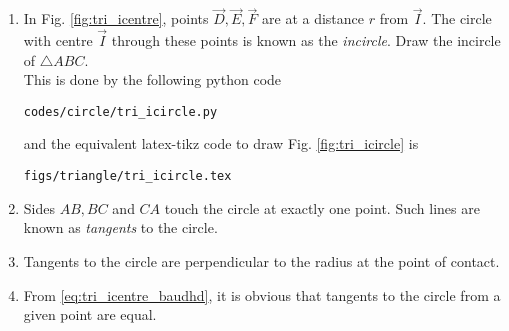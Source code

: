 \renewcommand{\theequation}{\theenumi}
\begin{enumerate}[label=\arabic*.,ref=\thesubsection.\theenumi]

\item In Fig. \ref{fig:tri_icentre}, points $\vec{D}, \vec{E}, \vec{F}$  are at a distance $r$ from $\vec{I}$.  The circle with centre $\vec{I}$ through these points is known as the {\em incircle}. Draw the incircle of $\triangle ABC$.
%
\\
\solution This is done by the following python code
%
\begin{lstlisting}
codes/circle/tri_icircle.py
\end{lstlisting}
%
and the equivalent latex-tikz code to draw Fig. \ref{fig:tri_icircle} is
%
\begin{lstlisting}
figs/triangle/tri_icircle.tex
\end{lstlisting}

%
\item Sides $AB, BC$ and $CA$ touch the circle at exactly one point.  Such lines are known as {\em tangents} to the circle.
\item Tangents to the circle are perpendicular to the radius at the point of contact.
\item From \eqref{eq:tri_icentre_baudhd}, it is  obvious that tangents to the circle from a given point are equal.
%

\end{enumerate}

